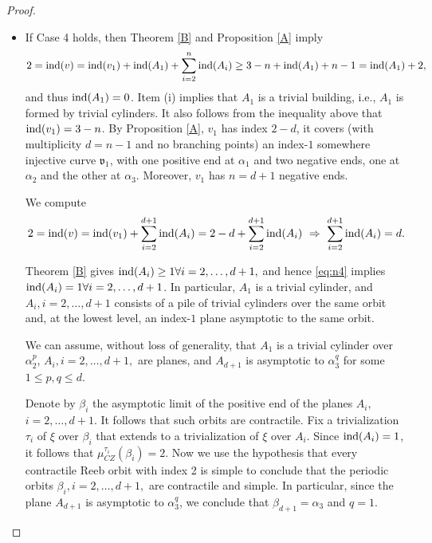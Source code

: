 \documentclass{amsart}
\newcommand{\ind}{\textnormal{ind}}
\begin{document}
\begin{proof}
\begin{itemize}
 \item If Case 4 holds, then Theorem \ref{B} and Proposition \ref{A} imply
$$2=\ind(v)=\ind(v_1)+\ind(A_1)+\sum_{i=2}^n \ind(A_i) \geq 3-n+\ind(A_1)+n-1= \ind(A_1)+2,$$
and thus  $\ind(A_1)=0$. Item (i) implies that $A_1$ is a trivial building, i.e., $A_1$ is formed by trivial cylinders. It also follows from the inequality above that $\ind(v_1)=3-n$. 
By Proposition \ref{A},  $v_1$ has index $2-d$, it covers (with multiplicity $d=n-1$ and no branching points) an index-$1$ somewhere injective curve $\mathfrak{v}_1$, with one positive end at $\alpha_1$ and two negative ends, one at $\alpha_2$ and the other at $\alpha_3$. Moreover, $v_1$ has $n=d+1$ negative ends.

We compute
\begin{equation}
2=\ind(v)=\ind(v_1)+\sum_{i=2}^{d+1}\ind(A_i)=2-d+\sum_{i=2}^{d+1}\ind(A_i) \,\, \Rightarrow \,\, \sum_{i=2}^{d+1}\ind(A_i)=d.
\label{eq:n4}
\end{equation}

Theorem \ref{B} gives $\ind(A_i)\geq 1 \forall i=2,\ldots,d+1,$ and hence \eqref{eq:n4} implies  $\ind(A_i)=1 \forall i=2,\ldots, d+1$. In particular, $A_1$ is a trivial cylinder, and $A_i,i=2,\ldots, d+1$ consists of a pile of trivial cylinders over the same orbit and, at the lowest level, an index-$1$ plane asymptotic to the same orbit. 

We can assume, without loss of generality, that $A_1$ is a trivial cylinder over $\alpha_2^p$, $A_i,i=2,\ldots,d+1,$ are planes, and $A_{d+1}$ is asymptotic to  $\alpha_3^q$ for some $1\leq p,q\leq d$.

Denote by $\beta_i$ the asymptotic limit of the positive end of the planes $A_i$, $i=2,\ldots, d+1$. It follows that such orbits are contractile. Fix a trivialization $\tau_i$ of $\xi$ over $\beta_i$ that extends to a trivialization of $\xi$ over $A_i$. Since $\ind(A_i)=1$, it follows that $\mu_{CZ}^{\tau_i}(\beta_i)=2$. Now we use the hypothesis that every contractile Reeb orbit with index 2 is simple
to conclude that the periodic orbits $\beta_i,i=2,\ldots,d+1,$ are contractile and simple. In particular, since the plane $A_{d+1}$ is asymptotic to $\alpha_3^q$, we conclude that $\beta_{d+1}=\alpha_3$ and $q=1$.


\end{itemize}
\end{proof}
\end{document}
